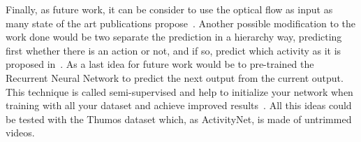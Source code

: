 Finally, as future work, it can be consider to use the optical flow as input as many state of the art publications propose~\cite{simonyan2014two}\cite{Ng_2015_CVPR}\cite{yao2015describing}. Another possible modification to the work done would be two separate the prediction in a hierarchy way, predicting first whether there is an action or not, and if so, predict which activity as it is proposed in~\cite{shoutemporal}.
As a last idea for future work would be to pre-trained the Recurrent Neural Network to predict the next output from the current output. This technique is called semi-supervised and help to initialize your network when training with all your dataset and achieve improved results~\cite{harvey2015semi}.
All this ideas could be tested with the Thumos dataset which, as ActivityNet, is made of untrimmed videos.







